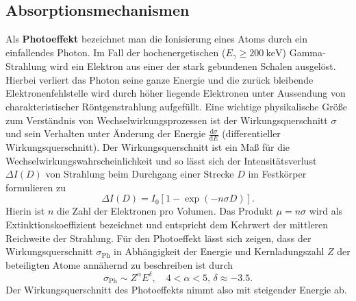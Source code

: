 \subsection{Absorptionsmechanismen}
Als \textbf{Photoeffekt} bezeichnet man die Ionisierung eines Atoms durch ein einfallendes Photon. Im Fall der
hochenergetischen ($E_\gamma \geq  \SI{200}{\kilo\electronvolt}$) Gamma-Strahlung wird ein Elektron aus einer der stark gebundenen Schalen
ausgelöst. Hierbei verliert das Photon seine ganze Energie und die zurück bleibende Elektronenfehlstelle wird durch
höher liegende Elektronen unter Aussendung von charakteristischer Röntgenstrahlung aufgefüllt. Eine wichtige physikalische
Größe zum Verständnis von Wechselwirkungsprozessen ist der Wirkungsquerschnitt $\sigma$ und sein Verhalten unter
Änderung der Energie $\frac{\mathup{d}\sigma}{\mathup{d}E}$ (differentieller Wirkungsquerschnitt). Der Wirkungsquerschnitt
ist ein Maß für die Wechselwirkungswahrscheinlichkeit und so lässt sich der Intensitätsverlust $\Delta I(D)$ von Strahlung beim Durchgang einer
Strecke $D$ im Festkörper formulieren zu
\begin{equation}
    \Delta I(D) = I_0 \left[1 -  \exp\left(- n \sigma D\right)\right].
\end{equation}
Hierin ist $n$ die Zahl der Elektronen pro Volumen. Das Produkt $\mu = n \sigma$ wird als Extinktionskoeffizient
bezeichnet und entspricht dem Kehrwert der mittleren Reichweite der Strahlung.
Für den Photoeffekt lässt sich zeigen, dass der Wirkungsquerschnitt $\sigma_{\text{Ph}}$ in Abhängigkeit der Energie und
Kernladungszahl $Z$ der beteiligten Atome annähernd zu beschreiben ist durch
\begin{equation}
    \sigma_{\text{Ph}} \sim Z^{\alpha} E^{\delta}, \quad 4 < \alpha < 5, \, \delta \approx -\num{3.5}.
    \label{eq:wirkungsquerschnitt_photo}
\end{equation}
Der Wirkungsquerschnitt des Photoeffekts nimmt also mit steigender Energie ab.

